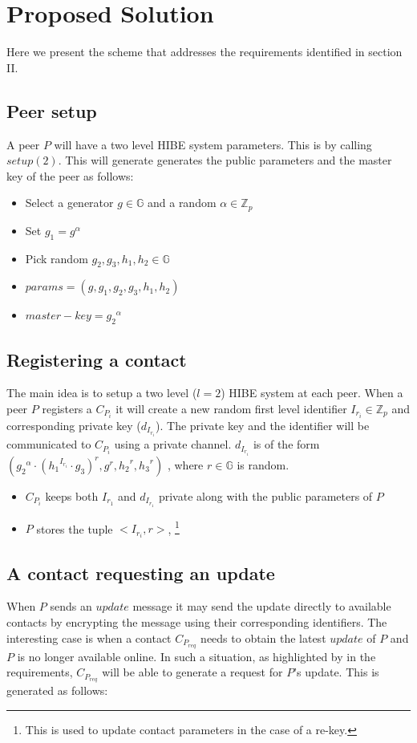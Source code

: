 \section{Proposed Solution}

Here we present the scheme that addresses the requirements identified in section II.

\subsection{Peer setup}
A peer $P$ will have a two level HIBE system parameters. This is by calling $setup(2)$.
This will generate generates the public parameters and the master key of the peer as follows:
\begin{itemize}
	\item Select a generator $g \in \mathbb{G}$ and a random $\alpha \in \mathbb{Z}_p$
	\item Set $g_1 = g^{\alpha}$
	\item Pick random $g_2, g_3, h_1, h_2 \in \mathbb{G}$
	\item $params = (g, g_1, g_2, g_3, h_1, h_2)$
	\item $master-key = {g_2}^{\alpha}$
\end{itemize}


\subsection{Registering a contact}

The main idea is to setup a two level ($l=2$) HIBE system at each peer. When a peer $P$ registers a $C_{P_i}$ it will create a new random first level identifier $I_{r_i} \in \mathbb{Z}_p$ and corresponding private key ($d_{I_{r_i}}$). The private key and the identifier will be communicated to $C_{P_i}$ using a private channel. $d_{I_{r_i}}$ is of the form
$({{g_2}^{\alpha}} \cdot {({{h_1}^{I_{r_i}}} \cdot {g_3} )}^r , g^r, {h_2}^r, {h_3}^r)$ ,
where $r \in \mathbb{G}$ is random.

\begin{itemize}
\item $C_{P_i}$ keeps both $I_{r_1}$ and $d_{I_{r_1}}$ private along with the public parameters of $P$
\item $P$ stores the tuple $<I_{r_i}, r>$, \footnote {This is used to update contact parameters in the case of a re-key.}
\end{itemize}


\subsection{A contact requesting an update}
When $P$ sends an $update$ message it may send the update directly to available contacts by encrypting the message using their corresponding identifiers. The interesting case is when a contact $C_{P_{req}}$ needs to obtain the latest $update$ of $P$ and $P$ is no longer available online. In such a situation, as highlighted by in the requirements, $C_{P_{req}}$ will be able to generate a request for $P$'s update. This is generated as follows:

